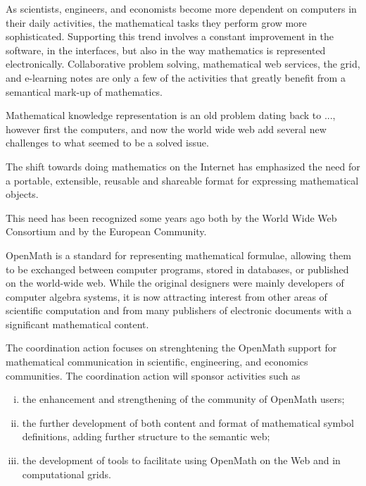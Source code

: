\documentclass{euproposal}
\begin{document}
As scientists, engineers, and economists become more
dependent on computers in their daily activities, the
mathematical tasks they perform grow more sophisticated. Supporting
this trend involves a constant improvement in the software, in the
interfaces, but also in the way mathematics is represented
electronically. Collaborative problem solving, mathematical web
services, the grid, and e-learning notes are only a few of the activities that
greatly benefit from a semantical mark-up of mathematics. 

Mathematical knowledge representation is an old problem dating back to
..., however first the computers, and now the world wide web add
several new challenges to what seemed to be a solved issue.

The shift towards doing mathematics on the Internet has emphasized the
need for a portable, extensible, reusable and shareable format for
expressing mathematical objects.

This need has been recognized some years ago both by the World Wide
Web Consortium and by the European Community. 

OpenMath is a standard for representing mathematical formulae,
allowing them to be exchanged between computer programs, stored in
databases, or published on the world-wide web.  While the original
designers were mainly developers of computer algebra systems, it is
now attracting interest from other areas of scientific computation and
from many publishers of electronic documents with a significant
mathematical content. 





The coordination action focuses on strenghtening the OpenMath support for
mathematical communication in scientific, engineering, and economics
communities.  The coordination action will sponsor
activities such as
\begin{enumerate}[(i)]
\item the enhancement and strengthening of the community of OpenMath
users;
\item the further development of both content and format of mathematical symbol definitions, adding
further structure to the semantic web;
\item the development of tools to facilitate using OpenMath on the Web and in
computational grids.
\end{enumerate}
\end{document}
